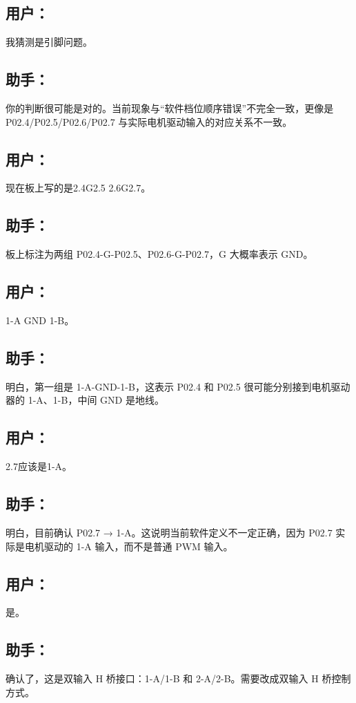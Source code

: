 \documentclass[11pt,a4paper,fontset=fandol]{ctexart}
\begin{document}
\subsection*{用户：}
我猜测是引脚问题。

\subsection*{助手：}
你的判断很可能是对的。当前现象与“软件档位顺序错误”不完全一致，更像是 P02.4/P02.5/P02.6/P02.7 与实际电机驱动输入的对应关系不一致。

\subsection*{用户：}
现在板上写的是2.4G2.5 2.6G2.7。

\subsection*{助手：}
板上标注为两组 P02.4-G-P02.5、P02.6-G-P02.7，G 大概率表示 GND。

\subsection*{用户：}
1-A GND 1-B。

\subsection*{助手：}
明白，第一组是 1-A-GND-1-B，这表示 P02.4 和 P02.5 很可能分别接到电机驱动器的 1-A、1-B，中间 GND 是地线。

\subsection*{用户：}
2.7应该是1-A。

\subsection*{助手：}
明白，目前确认 P02.7 → 1-A。这说明当前软件定义不一定正确，因为 P02.7 实际是电机驱动的 1-A 输入，而不是普通 PWM 输入。

\subsection*{用户：}
是。

\subsection*{助手：}
确认了，这是双输入 H 桥接口：1-A/1-B 和 2-A/2-B。需要改成双输入 H 桥控制方式。
\end{document}
